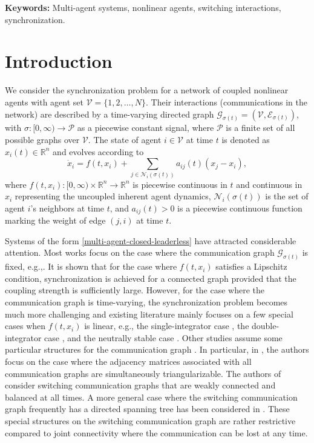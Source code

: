 \documentclass[a4paper, 11pt]{article}
\def\R{\mathbb{R}}
\begin{document}
{\bf Keywords:} Multi-agent systems, nonlinear agents, switching interactions, synchronization.

\section{Introduction} \label{sec-intro}
We consider the synchronization problem for a network of coupled nonlinear agents
with agent set $\mathcal{V}=\{1,2,\ldots, N\}$.
Their interactions (communications in the network) are described
by a time-varying directed graph $\mathcal{G}_{\sigma(t)}=(\mathcal{V}, \mathcal{E}_{\sigma(t)})$,
with $\sigma: [0,\infty) \rightarrow  \mathcal{P}$ as a piecewise constant signal, where $\mathcal{P}$ is a finite set of all possible graphs over $\mathcal{V}$.
The state of agent $i \in \mathcal{V}$ at time $t$ is denoted as $x_i(t) \in \R^n$ and
evolves according to
\begin{equation}\label{multi-agent-closed-leaderless}
\dot{x}_i = f(t,x_i) + \sum _{j \in \mathcal{N}_i(\sigma(t))} a_{ij}(t)(x_j-x_i),
\end{equation}
where $f(t,x_i): [0,\infty) \times {\R}^n  \rightarrow {\R}^n$ is piecewise continuous in $t$ and continuous in $x_i$
representing the uncoupled inherent agent dynamics,
$\mathcal{N}_i(\sigma(t))$ is the set of agent $i$'s neighbors at time $t$,
and $a_{ij}(t)>0$ is a piecewise continuous function marking the weight of edge $(j,i)$ at time $t$.

Systems of the form \eqref{multi-agent-closed-leaderless} have attracted considerable attention.
Most works focus on the case where the communication graph $\mathcal{G}_{\sigma(t)}$ is fixed, e.g.,\cite{wu-chua,wu-book,belykh-belykh-hasler,delellis-circuit,yu-chen-cao-tac2011,munz3,liu-cao-wu}. It is shown that
for the case where $f(t,x_i)$ satisfies a Lipschitz condition,
synchronization is achieved for a connected graph provided that the coupling strength is sufficiently large.
However, for the case where the communication graph is time-varying, the synchronization problem becomes much more challenging and existing literature mainly focuses on a few special cases when $f(t,x_i)$ is linear, e.g., the single-integrator case \cite{jadbabaie-lin-morse,moreau,lin07}, the double-integrator case \cite{ren-beard}, and the neutrally stable case \cite{scardovi-sepulchre,su-huang-tac}. Other studies assume some particular structures for the communication graph \cite{zhao-hill-liu,qin-gao-zheng,wen-duan-chen-yu}.
In particular, in \cite{zhao-hill-liu}, the authors focus on the case where the adjacency matrices associated with all communication graphs are simultaneously triangularizable. The authors of \cite{qin-gao-zheng} consider switching communication graphs that are weakly connected and balanced at all times. A more general case where the switching communication graph frequently has a directed spanning tree has been considered in \cite{wen-duan-chen-yu}. These special structures on the switching communication graph are rather restrictive compared to joint connectivity where the communication can be lost at any time.
\end{document}
